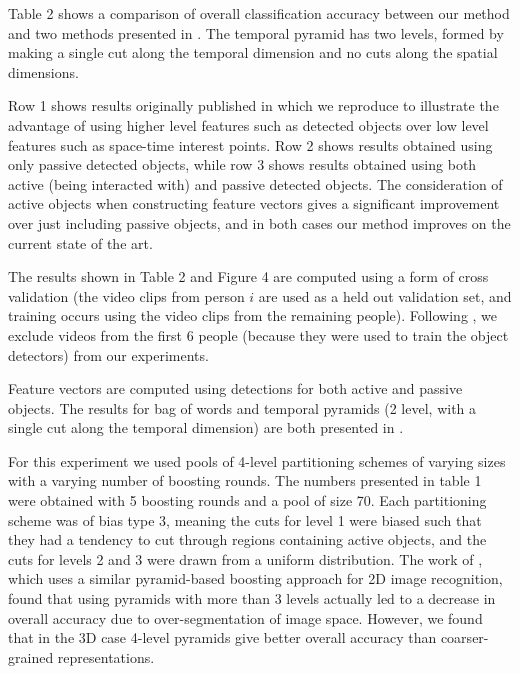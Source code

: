\documentclass{bmvc2k}
\begin{document}
  Table 2 shows a comparison of overall classification accuracy between our
  method and two methods presented in \cite{Ramanan12}. The temporal pyramid
  has two levels, formed by making a single cut along the temporal
  dimension and no cuts along the spatial dimensions.
  
  Row 1 shows results originally published in \cite{Ramanan12} which we
  reproduce to illustrate the advantage of using higher level features such
  as detected objects over low level features such as space-time interest
  points.  Row 2 shows results
  obtained using only passive detected objects, while row 3 shows results obtained
  using both active (being interacted with) and passive detected objects.
  The consideration of active objects when constructing feature vectors
  gives a significant improvement over just including passive objects, and
  in both cases our method improves on the current state of the art.

	The results shown in Table 2 and Figure 4 are computed using a form of cross
	validation (the video clips from person $i$ are used as a held out validation set, and
	training occurs using the video clips from the remaining people).
  Following \cite{Ramanan12}, we exclude videos from the first 6 people
  (because they were used to train the object detectors) from our
  experiments.
  
  Feature vectors are computed using detections for both active and passive
  objects. The results for bag of words and temporal pyramids (2 level, with
  a single cut along the temporal dimension) are both presented in
  \cite{Ramanan12}.
  
  For this experiment we used pools of 4-level partitioning schemes of
  varying sizes with a varying number of boosting rounds. The numbers
  presented in table 1 were obtained with 5 boosting rounds and a pool of
  size 70.
  Each partitioning scheme was of bias type 3, meaning the cuts for level 1
  were biased such that they had a tendency to cut through regions containing
  active objects, and the cuts for levels 2 and 3 were drawn from a uniform
  distribution. The work of \cite{Jiang12}, which uses a similar
  pyramid-based boosting approach for 2D image recognition, found that using
  pyramids with more than 3 levels actually led to a decrease in overall
  accuracy due to over-segmentation of image space. However, we found that in the
  3D case 4-level pyramids give better overall accuracy than coarser-grained
  representations.
	
\end{document}
